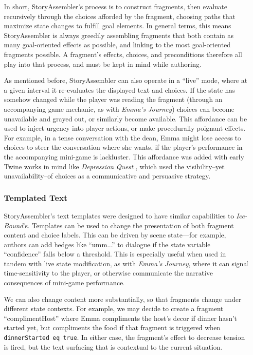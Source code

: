 In short, StoryAssembler's process is to construct fragments, then evaluate recursively through the choices afforded by the fragment, choosing paths that maximize state changes to fulfill goal elements. In general terms, this means StoryAssembler is always greedily assembling fragments that both contain as many goal-oriented effects as possible, and linking to the most goal-oriented fragments possible. A fragment's effects, choices, and preconditions therefore all play into that process, and must be kept in mind while authoring.

As mentioned before, StoryAssembler can also operate in a ``live'' mode, where at a given interval it re-evaluates the displayed text and choices. If the state has somehow changed while the player was reading the fragment (through an accompanying game mechanic, as with \textit{Emma's Journey}) choices can become unavailable and grayed out, or similarly become available. This affordance can be used to inject urgency into player actions, or make procedurally poignant effects. For example, in a tense conversation with the dean, Emma might lose access to choices to steer the conversation where she wants, if the player's performance in the accompanying mini-game is lackluster. This affordance was added with early Twine works in mind like \textit{Depression Quest} \cite{quinn_2013}, which used the visibility--yet unavailability--of choices as a communicative and persuasive strategy.

\subsubsection{Templated Text}
\label{templated-text}

StoryAssembler's text templates were designed to have similar capabilities to \textit{Ice-Bound}'s. Templates can be used to change the presentation of both fragment content and choice labels. This can be driven by scene state---for example, authors can add hedges like ``umm...'' to dialogue if the state variable ``confidence'' falls below a threshold. This is especially useful when used in tandem with live state modification, as with \textit{Emma's Journey}, where it can signal time-sensitivity to the player, or otherwise communicate the narrative consequences of mini-game performance.

We can also change content more substantially, so that fragments change under different state contexts. For example, we may decide to create a fragment ``complimentHost'' where Emma compliments the host's decor if dinner hasn't started yet, but compliments the food if that fragment is triggered when \texttt{dinnerStarted eq true}. In either case, the fragment's effect to decrease tension is fired, but the text surfacing that is contextual to the current situation.

